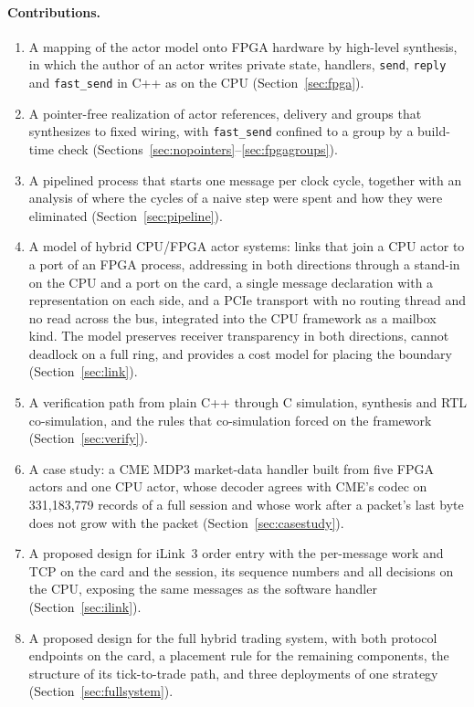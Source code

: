 \documentclass[11pt]{article}
\newcommand{\fs}{\texttt{fast\_send}}
\newcommand{\snd}{\texttt{send}}
\begin{document}
\paragraph{Contributions.}
\begin{enumerate}[leftmargin=1.6em]
  \item A mapping of the actor model onto FPGA hardware by high-level synthesis,
  in which the author of an actor writes private state, handlers, \snd{},
  \texttt{reply} and \fs{} in C++ as on the CPU (Section~\ref{sec:fpga}).
  \item A pointer-free realization of actor references, delivery and groups
  that synthesizes to fixed wiring, with \fs{} confined to a group by a
  build-time check (Sections~\ref{sec:nopointers}--\ref{sec:fpgagroups}).
  \item A pipelined process that starts one message per clock cycle, together
  with an analysis of where the cycles of a naive step were spent and how they
  were eliminated (Section~\ref{sec:pipeline}).
  \item A model of hybrid CPU/FPGA actor systems: links that join a CPU actor
  to a port of an FPGA process, addressing in both directions through a
  stand-in on the CPU and a port on the card, a single message declaration with
  a representation on each side, and a PCIe transport with no routing thread
  and no read across the bus, integrated into the CPU framework as a mailbox
  kind. The model preserves receiver transparency in both directions, cannot
  deadlock on a full ring, and provides a cost model for placing the boundary
  (Section~\ref{sec:link}).
  \item A verification path from plain C++ through C simulation, synthesis and
  RTL co-simulation, and the rules that co-simulation forced on the framework
  (Section~\ref{sec:verify}).
  \item A case study: a CME MDP3 market-data handler built from five FPGA
  actors and one CPU actor, whose decoder agrees with CME's codec on
  331{,}183{,}779 records of a full session and whose work after a packet's last
  byte does not grow with the packet (Section~\ref{sec:casestudy}).
  \item A proposed design for iLink~3 order entry with the per-message work
  and TCP on the card and the session, its sequence numbers and all decisions
  on the CPU, exposing the same messages as the software handler
  (Section~\ref{sec:ilink}).
  \item A proposed design for the full hybrid trading system, with both
  protocol endpoints on the card, a placement rule for the remaining
  components, the structure of its tick-to-trade path, and three deployments of
  one strategy (Section~\ref{sec:fullsystem}).
\end{enumerate}
\end{document}
